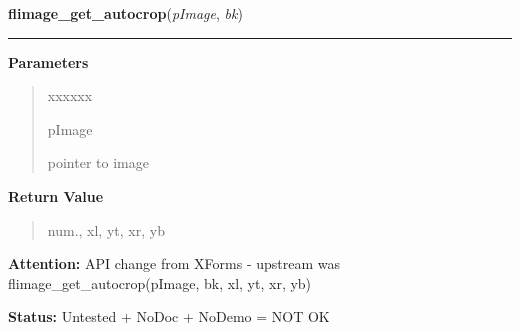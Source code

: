 \hspace{.8\funcindent}\begin{boxedminipage}{\funcwidth}

    \raggedright \textbf{flimage\_get\_autocrop}(\textit{pImage}, \textit{bk})

    \vspace{-1.5ex}

    \rule{\textwidth}{0.5\fboxrule}
\setlength{\parskip}{2ex}
\setlength{\parskip}{1ex}
      \textbf{Parameters}
      \vspace{-1ex}

      \begin{quote}
        \begin{Ventry}{xxxxxx}

          \item[pImage]

          pointer to image

        \end{Ventry}

      \end{quote}

      \textbf{Return Value}
    \vspace{-1ex}

      \begin{quote}
      num., xl, yt, xr, yb

      \end{quote}

\textbf{Attention:} API change from XForms - upstream was flimage\_get\_autocrop(pImage, bk, 
xl, yt, xr, yb)



\textbf{Status:} Untested + NoDoc + NoDemo = NOT OK



    \end{boxedminipage}

    \label{xformslib:flflimage:flimage_crop}

    \vspace{0.5ex}

